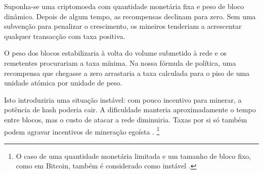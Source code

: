 Suponha-se uma criptomoeda com quantidade monetária fixa e peso de bloco
dinâmico. Depois de algum tempo, as recompensas declinam para zero. Sem uma
subvenção para penalizar o crescimento, os mineiros tenderiam a acrescentar
qualquer transacção com taxa positiva.


O peso dos blocos estabilizaria à volta do volume submetido à rede e os
remetentes procurariam a taxa mínima. Na nossa fórmula de política, uma
recompensa que chegasse a zero arrastaria a taxa calculada para o piso de uma
unidade atómica por unidade de peso.


Isto introduziria uma situação instável: com pouco incentivo para minerar, a
potência de hash poderia cair. A dificuldade manteria aproximadamente o tempo
entre blocos, mas o custo de atacar a rede diminuiria. Taxas por si só também
podem agravar incentivos de mineração egoísta
\cite{no-reward-instability,selfish-miner}.
\footnote{O caso de uma quantidade monetária limitada e um tamanho de bloco fixo, como em Bitcoin, também é considerado como instável \cite{no-reward-instability}.
}



